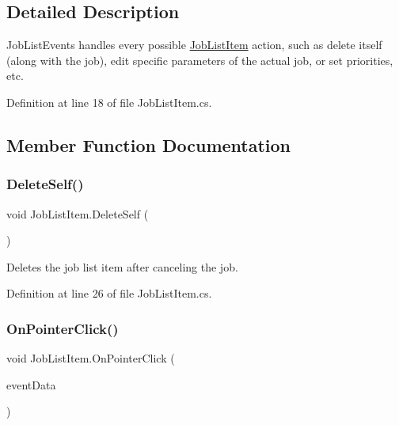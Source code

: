 \subsection{Detailed Description}
Job\+List\+Events handles every possible \hyperlink{class_job_list_item}{Job\+List\+Item} action, such as delete itself (along with the job), edit specific parameters of the actual job, or set priorities, etc. 



Definition at line 18 of file Job\+List\+Item.\+cs.



\subsection{Member Function Documentation}
\mbox{\label{class_job_list_item_aaf503eca8ab901394db8c2c3e913ba1e}} 
\subsubsection{\texorpdfstring{Delete\+Self()}{DeleteSelf()}}
{\footnotesize\ttfamily void Job\+List\+Item.\+Delete\+Self (\begin{DoxyParamCaption}{ }\end{DoxyParamCaption})}



Deletes the job list item after canceling the job. 



Definition at line 26 of file Job\+List\+Item.\+cs.

\mbox{\label{class_job_list_item_a2a8d8035d038ab095d9cf79a496619a2}} 
\subsubsection{\texorpdfstring{On\+Pointer\+Click()}{OnPointerClick()}}
{\footnotesize\ttfamily void Job\+List\+Item.\+On\+Pointer\+Click (\begin{DoxyParamCaption}\item[{Pointer\+Event\+Data}]{event\+Data }\end{DoxyParamCaption})}



